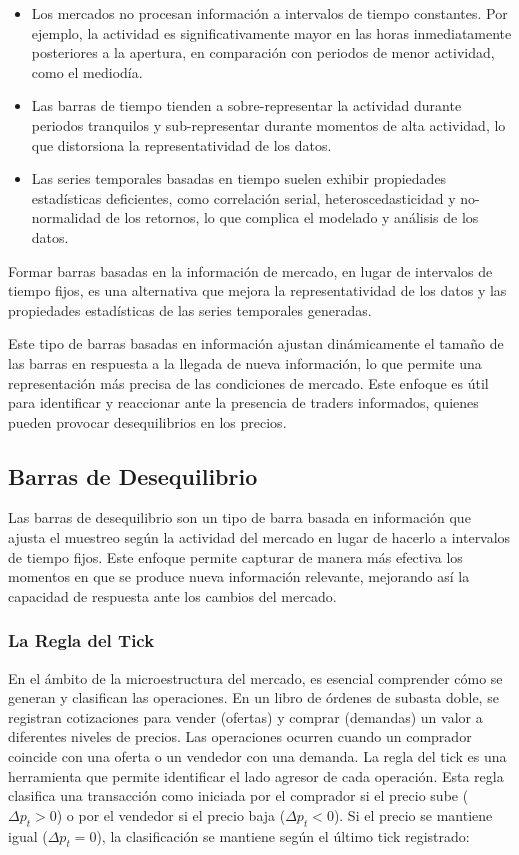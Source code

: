 \documentclass[a4paper,12pt, twoside]{report}
\begin{document}
\begin{itemize}
    \item Los mercados no procesan información a intervalos de tiempo constantes. Por ejemplo, la 
    actividad es significativamente mayor en las horas inmediatamente posteriores a la apertura, 
    en comparación con periodos de menor actividad, como el mediodía.
    \item Las barras de tiempo tienden a sobre-representar la actividad durante periodos tranquilos 
    y sub-representar durante momentos de alta actividad, lo que distorsiona la representatividad de los datos.
    \item Las series temporales basadas en tiempo suelen exhibir propiedades estadísticas deficientes, 
    como correlación serial, heteroscedasticidad y no-normalidad de los retornos, lo que complica el 
    modelado y análisis de los datos.
\end{itemize}

Formar barras basadas en la información de mercado, en lugar de intervalos de tiempo fijos, 
es una alternativa que mejora la representatividad de los datos y las propiedades estadísticas 
de las series temporales generadas. 

Este tipo de barras basadas en información ajustan dinámicamente el tamaño de las barras
en respuesta a la llegada de nueva información, lo que permite una representación
más precisa de las condiciones de mercado. Este enfoque es útil para identificar y reaccionar 
ante la presencia de traders
informados, quienes pueden provocar desequilibrios en los precios.

\subsection{Barras de Desequilibrio}

Las barras de desequilibrio son un tipo de barra basada en información que ajusta el muestreo 
según la actividad del mercado en lugar de hacerlo a intervalos de tiempo fijos. Este enfoque 
permite capturar de manera más efectiva los momentos en que se produce nueva información relevante, 
mejorando así la capacidad de respuesta ante los cambios del mercado.

\subsubsection{La Regla del Tick}

En el ámbito de la microestructura del mercado, es esencial comprender cómo se generan y clasifican las operaciones. En un 
libro de órdenes de subasta doble, se registran cotizaciones para vender (ofertas) y comprar (demandas) un valor a diferentes 
niveles de precios. Las operaciones ocurren cuando un comprador coincide con una oferta o un vendedor con una demanda. La regla 
del tick es una herramienta que permite identificar el lado agresor de cada operación. Esta regla clasifica una transacción 
como iniciada por el comprador si el precio sube (\(\Delta p_t > 0\)) o por el vendedor si el precio baja (\(\Delta p_t < 0\)). 
Si el precio se mantiene igual (\(\Delta p_t = 0\)), la clasificación se mantiene según el último tick registrado:
\end{document}
